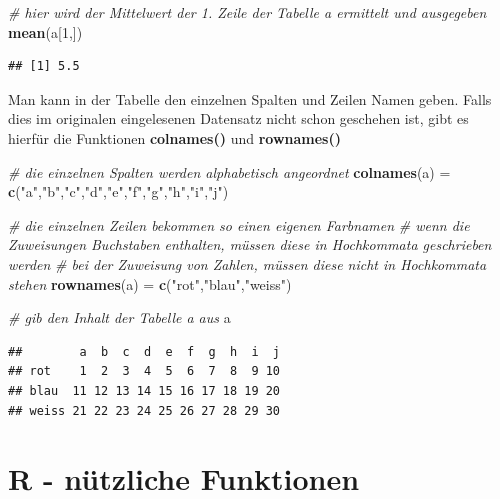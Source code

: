\documentclass[]{book}
\newenvironment{Shaded}{\begin{snugshade}}{\end{snugshade}}
\newcommand{\KeywordTok}[1]{\textcolor[rgb]{0.13,0.29,0.53}{\textbf{#1}}}
\newcommand{\DecValTok}[1]{\textcolor[rgb]{0.00,0.00,0.81}{#1}}
\newcommand{\StringTok}[1]{\textcolor[rgb]{0.31,0.60,0.02}{#1}}
\newcommand{\CommentTok}[1]{\textcolor[rgb]{0.56,0.35,0.01}{\textit{#1}}}
\newcommand{\NormalTok}[1]{#1}
\begin{document}
\begin{Shaded}
\begin{Highlighting}[]
\CommentTok{# hier wird der Mittelwert der 1. Zeile der Tabelle a ermittelt und ausgegeben}
\KeywordTok{mean}\NormalTok{(a[}\DecValTok{1}\NormalTok{,])}
\end{Highlighting}
\end{Shaded}

\begin{verbatim}
## [1] 5.5
\end{verbatim}

Man kann in der Tabelle den einzelnen Spalten und Zeilen Namen geben.
Falls dies im originalen eingelesenen Datensatz nicht schon geschehen
ist, gibt es hierfür die Funktionen \textbf{colnames()} und
\textbf{rownames()}

\begin{Shaded}
\begin{Highlighting}[]
\CommentTok{# die einzelnen Spalten werden alphabetisch angeordnet}
\KeywordTok{colnames}\NormalTok{(a) =}\StringTok{ }\KeywordTok{c}\NormalTok{(}\StringTok{"a"}\NormalTok{,}\StringTok{"b"}\NormalTok{,}\StringTok{"c"}\NormalTok{,}\StringTok{"d"}\NormalTok{,}\StringTok{"e"}\NormalTok{,}\StringTok{"f"}\NormalTok{,}\StringTok{"g"}\NormalTok{,}\StringTok{"h"}\NormalTok{,}\StringTok{"i"}\NormalTok{,}\StringTok{"j"}\NormalTok{)}

\CommentTok{# die einzelnen Zeilen bekommen so einen eigenen Farbnamen}
\CommentTok{# wenn die Zuweisungen Buchstaben enthalten, müssen diese in Hochkommata geschrieben werden}
\CommentTok{# bei der Zuweisung von Zahlen, müssen diese nicht in Hochkommata stehen}
\KeywordTok{rownames}\NormalTok{(a) =}\StringTok{ }\KeywordTok{c}\NormalTok{(}\StringTok{"rot"}\NormalTok{,}\StringTok{"blau"}\NormalTok{,}\StringTok{"weiss"}\NormalTok{)}

\CommentTok{# gib den Inhalt der Tabelle a aus}
\NormalTok{a}
\end{Highlighting}
\end{Shaded}

\begin{verbatim}
##        a  b  c  d  e  f  g  h  i  j
## rot    1  2  3  4  5  6  7  8  9 10
## blau  11 12 13 14 15 16 17 18 19 20
## weiss 21 22 23 24 25 26 27 28 29 30
\end{verbatim}

\section{R - nützliche Funktionen}\label{r---nuxfctzliche-funktionen}
\end{document}
